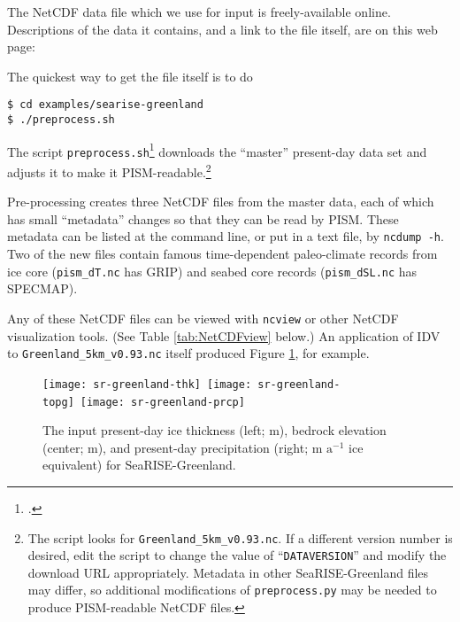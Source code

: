The NetCDF data file which we use for input is freely-available online.  Descriptions of the data it contains, and a link to the file itself, are on this web page: 
\medskip

\centerline{}
\medskip

\noindent The quickest way to get the file itself is to do
\begin{verbatim}
$ cd examples/searise-greenland
$ ./preprocess.sh
\end{verbatim}
\noindent The script \texttt{preprocess.sh}\footnote{.} downloads the ``master'' present-day data set and adjusts it to make it PISM-readable.\footnote{The script looks for \texttt{Greenland\_5km\_v0.93.nc}.  If a different version number is desired, edit the script to change the value of ``\texttt{DATAVERSION}'' and modify the download URL appropriately.  Metadata in other SeaRISE-Greenland files may differ, so additional modifications of \texttt{preprocess.py} may be needed to produce PISM-readable NetCDF files.}

Pre-processing creates three NetCDF files from the master data, each of which has small ``metadata'' changes so that they can be read by PISM.  These metadata can be listed at the command line, or put in a text file, by \texttt{ncdump -h}.  Two of the new files contain famous time-dependent paleo-climate records from ice core (\texttt{pism_dT.nc} has GRIP) and seabed core records (\texttt{pism_dSL.nc} has SPECMAP).

Any of these NetCDF files can be viewed with \texttt{ncview} or other NetCDF visualization tools.  (See Table \ref{tab:NetCDFview} below.)  An application of IDV to \texttt{Greenland_5km_v0.93.nc} itself produced Figure \ref{fig:sr-input}, for example.

\begin{figure}[ht]
\centering
\mbox{\texttt{[image: sr-greenland-thk]}
  \qquad
  \texttt{[image: sr-greenland-topg]}
  \qquad
  \texttt{[image: sr-greenland-prcp]}}
\caption{The input present-day ice thickness (left; m), bedrock elevation (center; m), and present-day precipitation (right; m $\text{a}^{-1}$ ice equivalent) for SeaRISE-Greenland.}
\label{fig:sr-input}
\end{figure}


